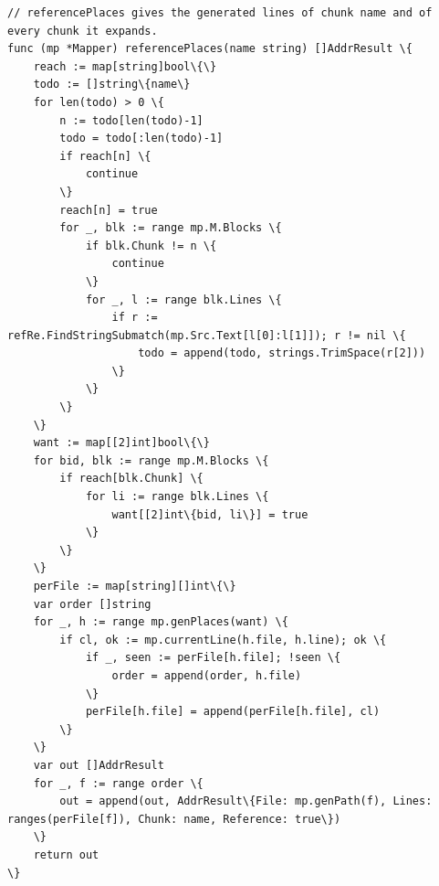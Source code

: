 \documentclass[10pt,a4paper]{article}
\newcounter{chunk}
\begin{document}
\begin{Verbatim}
// referencePlaces gives the generated lines of chunk name and of every chunk it expands.
func (mp *Mapper) referencePlaces(name string) []AddrResult \{
	reach := map[string]bool\{\}
	todo := []string\{name\}
	for len(todo) > 0 \{
		n := todo[len(todo)-1]
		todo = todo[:len(todo)-1]
		if reach[n] \{
			continue
		\}
		reach[n] = true
		for _, blk := range mp.M.Blocks \{
			if blk.Chunk != n \{
				continue
			\}
			for _, l := range blk.Lines \{
				if r := refRe.FindStringSubmatch(mp.Src.Text[l[0]:l[1]]); r != nil \{
					todo = append(todo, strings.TrimSpace(r[2]))
				\}
			\}
		\}
	\}
	want := map[[2]int]bool\{\}
	for bid, blk := range mp.M.Blocks \{
		if reach[blk.Chunk] \{
			for li := range blk.Lines \{
				want[[2]int\{bid, li\}] = true
			\}
		\}
	\}
	perFile := map[string][]int\{\}
	var order []string
	for _, h := range mp.genPlaces(want) \{
		if cl, ok := mp.currentLine(h.file, h.line); ok \{
			if _, seen := perFile[h.file]; !seen \{
				order = append(order, h.file)
			\}
			perFile[h.file] = append(perFile[h.file], cl)
		\}
	\}
	var out []AddrResult
	for _, f := range order \{
		out = append(out, AddrResult\{File: mp.genPath(f), Lines: ranges(perFile[f]), Chunk: name, Reference: true\})
	\}
	return out
\}
\end{Verbatim}
\end{document}

